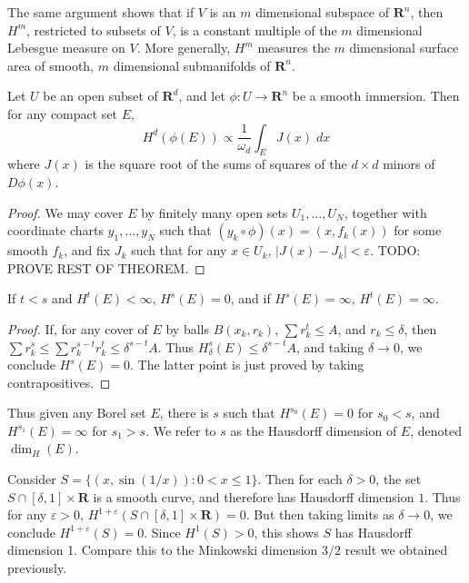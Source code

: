 The same argument shows that if $V$ is an $m$ dimensional subspace of $\mathbf{R}^n$, then $H^m$, restricted to subsets of $V$, is a constant multiple of the $m$ dimensional Lebesgue measure on $V$. More generally, $H^m$ measures the $m$ dimensional surface area of smooth, $m$ dimensional submanifolds of $\mathbf{R}^n$.

\begin{theorem}
	Let $U$ be an open subset of $\mathbf{R}^d$, and let $\phi: U \to \mathbf{R}^n$ be a smooth immersion. Then for any compact set $E$,
	\[ H^d(\phi(E)) \propto \frac{1}{\omega_d} \int_E J(x)\; dx \]
	where $J(x)$ is the square root of the sums of squares of the $d \times d$ minors of $D\phi(x)$.
\end{theorem}
\begin{proof}
	We may cover $E$ by finitely many open sets $U_1, \dots, U_N$, together with coordinate charts $y_1, \dots, y_N$ such that $(y_k \circ \phi)(x) = (x,f_k(x))$ for some smooth $f_k$, and fix $J_k$ such that for any $x \in U_k$, $|J(x) - J_k| < \varepsilon$. TODO: PROVE REST OF THEOREM.
\end{proof}

\begin{lemma}
	If $t < s$ and $H^t(E) < \infty$, $H^s(E) = 0$, and if $H^s(E) = \infty$, $H^t(E) = \infty$.
\end{lemma}
\begin{proof}
	If, for any cover of $E$ by balls $B(x_k,r_k)$, $\sum r_k^t \leq A$, and $r_k \leq \delta$, then $\sum r_k^s \leq \sum r_k^{s-t} r_k^t \leq \delta^{s-t} A$. Thus $H^s_\delta(E) \leq \delta^{s-t} A $, and taking $\delta \to 0$, we conclude $H^s(E) = 0$. The latter point is just proved by taking contrapositives.
\end{proof}

Thus given any Borel set $E$, there is $s$ such that $H^{s_0}(E) = 0$ for $s_0 < s$, and $H^{s_1}(E) = \infty$ for $s_1 > s$. We refer to $s$ as the Hausdorff dimension of $E$, denoted $\dim_H(E)$.

\begin{example}
	Consider $S = \{ (x,\sin(1/x)) : 0 < x \leq 1 \}$. Then for each $\delta > 0$, the set $S \cap [\delta,1] \times \mathbf{R}$ is a smooth curve, and therefore has Hausdorff dimension $1$. Thus for any $\varepsilon > 0$, $H^{1 + \varepsilon}(S \cap [\delta,1] \times \mathbf{R}) = 0$. But then taking limits as $\delta \to 0$, we conclude $H^{1+\varepsilon}(S) = 0$. Since $H^1(S) > 0$, this shows $S$ has Hausdorff dimension 1. Compare this to the Minkowski dimension $3/2$ result we obtained previously.
\end{example}


